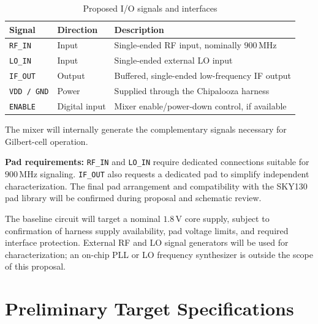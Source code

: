 \documentclass[11pt,letterpaper]{article}
\begin{document}
\begin{table}[htbp]
\centering
\caption{Proposed I/O signals and interfaces}
\label{tab:io}
\begin{tabularx}{\textwidth}{@{}llY@{}}
\toprule
\textbf{Signal} &
\textbf{Direction} &
\textbf{Description} \\
\midrule

\texttt{RF\_IN} &
Input &
Single-ended RF input, nominally
\(900\,\mathrm{MHz}\) \\

\texttt{LO\_IN} &
Input &
Single-ended external LO input \\

\texttt{IF\_OUT} &
Output &
Buffered, single-ended low-frequency IF output \\

\texttt{VDD / GND} &
Power &
Supplied through the Chipalooza harness \\

\texttt{ENABLE} &
Digital input &
Mixer enable/power-down control, if available \\

\bottomrule
\end{tabularx}
\end{table}

The mixer will internally generate the complementary
signals necessary for Gilbert-cell operation.

\textbf{Pad requirements:}
\texttt{RF\_IN} and \texttt{LO\_IN} require dedicated
connections suitable for \(900\,\mathrm{MHz}\) signaling.
\texttt{IF\_OUT} also requests a dedicated pad to simplify
independent characterization. The final pad arrangement
and compatibility with the SKY130 pad library will be
confirmed during proposal and schematic review.

The baseline circuit will target a nominal
\(1.8\,\mathrm{V}\) core supply, subject to confirmation
of harness supply availability, pad voltage limits,
and required interface protection.
External RF and LO signal generators will be used for
characterization; an on-chip PLL or LO frequency
synthesizer is outside the scope of this proposal.


\section{Preliminary Target Specifications}
\end{document}
